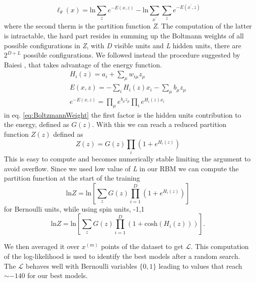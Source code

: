 \documentclass[prl,twocolumn]{revtex4-1}
\begin{document}
\begin{equation}
\ell_{\theta }\left( x \right) = \text{ln} \sum_{z}^{}{e^{-E\left( x,z \right)}} -\text{ln}\sum_{x^{\prime }}^{}{\sum_{z}^{}{e^{-E\left( x^{\prime},z \right)}}}
\end{equation}
where the second therm is the partition function \emph{Z}. The computation of the latter is intractable, the hard part resides in summing up the Boltmann weights of all possible configurations in \emph{Z}, with \emph{D} visible units and \emph{L} hidden units, there are $2^{D+L}$ possible configurations. We followed instead the procedure suggested by Baiesi \cite{baiesi}, that takes advantage of the energy function.
\begin{gather}
H_{i}\left( z \right) = a_{i}+ \sum_{\mu }^{}{w_{i\mu }z_{\mu }} \\
E\left( x,z \right) = - \sum_{i}^{}{H_{i}\left( z \right)x_{i}}-\sum_{\mu }^{}{b_{\mu }z_{\mu }}\\
e^{-E\left( x,z \right)} = \prod_\mu  e^{b_{\mu }z_{\mu }}\prod_{i}e^{H_{i}\left( z \right)x_{i}}\label{eq:BoltzmannWeight}
\end{gather}
in eq. \ref{eq:BoltzmannWeight} the first factor is the hidden units contribution to the energy, defined as $G\left( z \right)$. With this we can reach a reduced partition function $Z\left( z \right)$ defined as
\begin{equation}
Z\left( z \right) = G\left( z \right) \prod_{i}\left( 1+e^{H_{i}\left( z \right)} \right)
\end{equation}
This is easy to compute and becomes numerically stable limiting the argument to avoid overflow. Since we used low value of \emph{L} in our RBM we can compute the partition function at the start of the training
\begin{equation}
\text{ln}Z = \text{ln}\left[ \sum_{z}^{}{G\left( z \right) \prod_{i=1}^{D} \left( 1+e^{H_{i}\left( z \right)} \right)} \right]	
\end{equation}
for Bernoulli units, while using spin units, {-1,1} 
\begin{equation}
	\text{ln}Z = \text{ln}\left[ \sum_{z}^{}{G\left( z \right)\prod_{i=1}^{D}{\left( 1+\text{cosh}\left( H_{i}\left( z \right)\right)\right)}} \right].
\end{equation}

We then averaged it over $x^{\left( m \right)}$ points of the dataset to get $\mathcal{L}$. This computation of the log-likelihood is used to identify the best models after a random search. The $\mathcal{L}$ behaves well with Bernoulli variables $\{0,1\}$ leading to values that reach $\sim -140$ for our best models.
    
\end{document}
